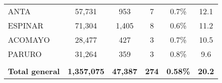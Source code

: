 \begin{tabular}{lccccc}
	\cellcolor[HTML]{FFFF99}ANTA                                    & 57,731               & 953                                  & 7                    & 0.7\%                      & 12.1                                        \\
	\cellcolor[HTML]{FFFF99}ESPINAR                                 & 71,304               & 1,405                                & 8                    & 0.6\%                      & 11.2                                        \\
	\cellcolor[HTML]{FFFF99}ACOMAYO                                 & 28,477               & 427                                  & 3                    & 0.7\%                      & 10.5                                        \\
	\cellcolor[HTML]{FFFF99}PARURO                                  & 31,264               & 359                                  & 3                    & 0.8\%                      & 9.6                                         \\
	& \multicolumn{1}{l}{} & \multicolumn{1}{l}{}                 & \multicolumn{1}{l}{} & \multicolumn{1}{l}{}       & \multicolumn{1}{l}{}                        \\
	\rowcolor[HTML]{DDEBF7} 
	\textbf{Total general}                                          & \textbf{1,357,075}   & \textbf{47,387}                      & \textbf{274}         & \textbf{0.58\%}            & \textbf{20.2}                              
\end{tabular}